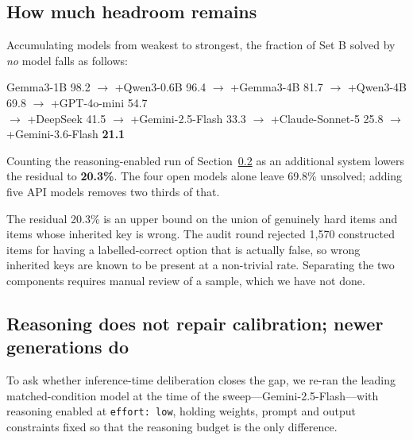 \documentclass{article} %
\begin{document}
\subsection{How much headroom remains}
\label{sec:headroom}

Accumulating models from weakest to strongest, the fraction of Set B solved by \emph{no}
model falls as follows:

\begin{center}
\begin{small}
Gemma3-1B 98.2 $\to$ +Qwen3-0.6B 96.4 $\to$ +Gemma3-4B 81.7 $\to$ +Qwen3-4B 69.8 $\to$
+GPT-4o-mini 54.7 \\
$\to$ +DeepSeek 41.5 $\to$ +Gemini-2.5-Flash 33.3 $\to$ +Claude-Sonnet-5 25.8 $\to$
+Gemini-3.6-Flash \textbf{21.1}
\end{small}
\end{center}

Counting the reasoning-enabled run of Section~\ref{sec:ablation} as an additional system
lowers the residual to \textbf{20.3\%}. The four open models alone leave 69.8\% unsolved;
adding five API models removes two thirds of that.

The residual 20.3\% is an upper bound on the union of genuinely hard items and items whose
inherited key is wrong. The audit round rejected 1,570 constructed items for having a
labelled-correct option that is actually false, so wrong inherited keys are known to be
present at a non-trivial rate. Separating the two components requires manual review of a
sample, which we have not done.

\subsection{Reasoning does not repair calibration; newer generations do}
\label{sec:ablation}

To ask whether inference-time deliberation closes the gap, we re-ran the leading
matched-condition model at the time of the sweep---Gemini-2.5-Flash---with reasoning
enabled at \texttt{effort: low}, holding weights, prompt and output constraints fixed so
that the reasoning budget is the only difference.
\end{document}

